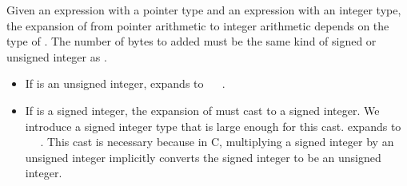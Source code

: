 Given an expression  with a pointer type and an expression
 with an integer type, the expansion of  from
pointer arithmetic to integer arithmetic depends on the type of
. The number of bytes to added must be the same kind of
signed or unsigned integer as .

\begin{itemize}
\item
  If  is an unsigned integer,  expands to
   \plusovf\  \mulovf\ .
\item
  If  is a signed integer, the expansion of 
  must cast  to a signed integer. We introduce a
  signed integer type  that is large enough for
  this cast.  expands to  \plusovf\
   \code{)} \mulovf\ . This cast is
  necessary because in C, multiplying a signed integer by an unsigned
  integer implicitly converts the signed integer to be an unsigned
  integer.
\end{itemize}
